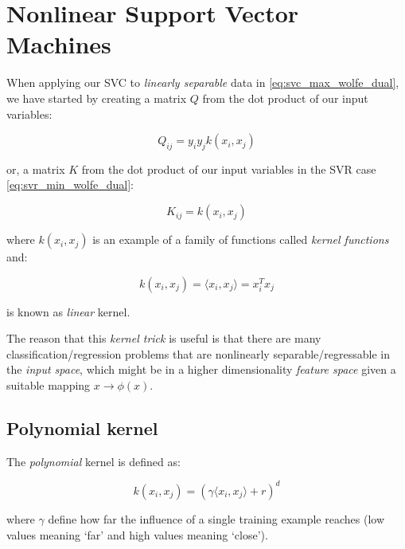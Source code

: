 \section{Nonlinear Support Vector Machines}

When applying our SVC to \emph{linearly separable} data in \ref{eq:svc_max_wolfe_dual}, we have started by creating a matrix $Q$ from the dot product of our input variables:

\begin{equation} \label{eq:svc_hessian}
	Q_{ij} = y_i y_j k(x_i,x_j)
\end{equation}

or, a matrix $K$ from the dot product of our input variables in the SVR case \ref{eq:svr_min_wolfe_dual}:

\begin{equation} \label{eq:svr_hessian}
	K_{ij} = k(x_i,x_j)
\end{equation}

where $k(x_i,x_j)$ is an example of a family of functions called \emph{kernel functions} and:  

\begin{equation} \label{eq:kernel_function}
	k(x_i,x_j) = \langle x_i, x_j \rangle = x_i^T x_j
\end{equation}

is known as \emph{linear} kernel.

The reason that this \emph{kernel trick} is useful is that there are many classification/regression problems that are nonlinearly separable/regressable in the \emph{input space}, which might be in a higher dimensionality \emph{feature space} given a suitable mapping $x \rightarrow \phi(x)$.

\subsection{Polynomial kernel}

The \emph{polynomial} kernel is defined as:

\begin{equation} \label{eq:poly_kernel}
	k(x_i,x_j)=(\gamma \langle x_i, x_j\rangle + r)^d
\end{equation}

where $\gamma$ define how far the influence of a single training example reaches (low values meaning ‘far’ and high values meaning ‘close’).

